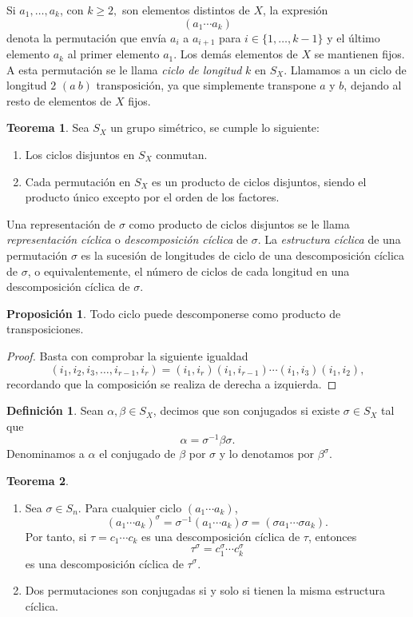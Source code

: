 \documentclass[12pt]{book}
\theoremstyle{definition}
\newtheorem{defi}{Definición}[section]
\newtheorem{teor}{Teorema}[section]
\newtheorem{prop}{Proposición}[section]
\begin{document}
Si $a_1,\ldots,a_k$, con $k\geq 2,$ son elementos distintos de $X$, la expresión
$$(a_1\cdots a_k)$$
denota la permutación que envía $a_i$ a $a_{i+1}$ para $i\in\{1,\ldots,k-1\}$ y el último elemento $a_k$ al primer elemento $a_1$. Los demás elementos de $X$ se mantienen fijos. A esta permutación se le llama \textit{ciclo de longitud} $k$ en $S_X$. Llamamos a un ciclo de longitud $2$ $(a\ b)$ transposición, ya que simplemente transpone $a$ y $b$, dejando al resto de elementos de $X$ fijos.

\begin{teor}
Sea $S_X$ un grupo simétrico, se cumple lo siguiente:
\begin{enumerate}
\item Los ciclos disjuntos en $S_X$ conmutan.
\item Cada permutación en $S_X$ es un producto de ciclos disjuntos, siendo el producto único excepto por el orden de los factores. 
\end{enumerate}
\label{teor:trans}
\end{teor}
Una representación de $\sigma$ como producto de ciclos disjuntos se le llama \textit{representación cíclica} o \textit{descomposición cíclica} de $\sigma$. La \textit{estructura cíclica} de una permutación $\sigma$ es la sucesión de longitudes de ciclo de una descomposición cíclica de $\sigma$, o equivalentemente, el número de ciclos de cada longitud en una descomposición cíclica de $\sigma$. 
\begin{prop}
Todo ciclo puede descomponerse como producto de transposiciones.
\label{prop:trans}
\end{prop}
\begin{proof} Basta con comprobar la siguiente igualdad
$$(i_1,i_2,i_3,\ldots,i_{r-1},i_r) = (i_1,i_r)(i_1,i_{r-1})\cdots(i_1,i_3)(i_1,i_2),$$
recordando que la composición se realiza de derecha a izquierda.
\end{proof}

\begin{defi}
Sean $\alpha,\beta\in S_X$, decimos que son conjugados si existe $\sigma\in S_X$ tal que $$\alpha = \sigma^{-1}\beta\sigma.$$
Denominamos a $\alpha$ el conjugado de $\beta$ por $\sigma$ y lo denotamos por $\beta^\sigma$.
\end{defi}


\begin{teor}
\ 

\begin{enumerate}
\item Sea $\sigma\in S_n$. Para cualquier ciclo $(a_1\cdots a_k)$,
$$(a_1 \cdots a_k)^\sigma= \sigma^{-1}(a_1 \cdots a_k)\sigma = (\sigma a_1 \cdots \sigma a_k).$$
Por tanto, si $\tau=c_1\cdots c_k$ es una descomposición cíclica de $\tau$, entonces
$$\tau^\sigma = c_1^\sigma\cdots c_k^\sigma$$
es una descomposición cíclica de $\tau^\sigma$.
\item Dos permutaciones son conjugadas si y solo si tienen la misma estructura cíclica.
\end{enumerate}
\end{teor}
\end{document}
